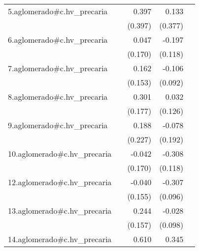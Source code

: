{\begin{longtable}{l*{4}{D{.}{.}{-1}}}
\addlinespace
5.aglomerado#c.hv\_precaria&                     &       0.397         &       0.133         &                     \\
            &                     &     (0.397)         &     (0.377)         &                     \\
\addlinespace
6.aglomerado#c.hv\_precaria&                     &       0.047         &      -0.197         &                     \\
            &                     &     (0.170)         &     (0.118)         &                     \\
\addlinespace
7.aglomerado#c.hv\_precaria&                     &       0.162         &      -0.106         &                     \\
            &                     &     (0.153)         &     (0.092)         &                     \\
\addlinespace
8.aglomerado#c.hv\_precaria&                     &       0.301         &       0.032         &                     \\
            &                     &     (0.177)         &     (0.126)         &                     \\
\addlinespace
9.aglomerado#c.hv\_precaria&                     &       0.188         &      -0.078         &                     \\
            &                     &     (0.227)         &     (0.192)         &                     \\
\addlinespace
10.aglomerado#c.hv\_precaria&                     &      -0.042         &      -0.308\sym{**} &                     \\
            &                     &     (0.170)         &     (0.118)         &                     \\
\addlinespace
12.aglomerado#c.hv\_precaria&                     &      -0.040         &      -0.307\sym{**} &                     \\
            &                     &     (0.155)         &     (0.096)         &                     \\
\addlinespace
13.aglomerado#c.hv\_precaria&                     &       0.244         &      -0.028         &                     \\
            &                     &     (0.157)         &     (0.098)         &                     \\
\addlinespace
14.aglomerado#c.hv\_precaria&                     &       0.610\sym{**} &       0.345         &                     \\

\end{longtable}}
